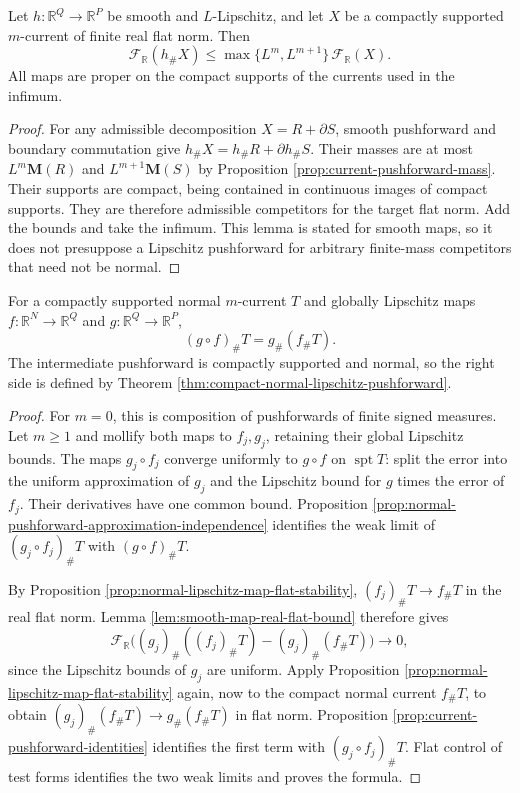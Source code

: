\begin{lemma}\label{lem:smooth-map-real-flat-bound}
Let $h:\mathbb R^Q\to\mathbb R^P$ be smooth and $L$-Lipschitz, and let $X$ be a compactly supported $m$-current of finite real flat norm. Then
\[
 \mathcal F_{\mathbb R}(h_\#X)
 \leq\max\{L^m,L^{m+1}\}\,\mathcal F_{\mathbb R}(X).
\]
All maps are proper on the compact supports of the currents used in the infimum.
\end{lemma}
\begin{proof}
For any admissible decomposition $X=R+\partial S$, smooth pushforward and boundary commutation give $h_\#X=h_\#R+\partial h_\#S$. Their masses are at most $L^m\mathbf M(R)$ and $L^{m+1}\mathbf M(S)$ by Proposition \ref{prop:current-pushforward-mass}. Their supports are compact, being contained in continuous images of compact supports. They are therefore admissible competitors for the target flat norm. Add the bounds and take the infimum. This lemma is stated for smooth maps, so it does not presuppose a Lipschitz pushforward for arbitrary finite-mass competitors that need not be normal.
\end{proof}

\begin{proposition}\label{prop:normal-lipschitz-pushforward-composition}
For a compactly supported normal $m$-current $T$ and globally Lipschitz maps $f:\mathbb R^N\to\mathbb R^Q$ and $g:\mathbb R^Q\to\mathbb R^P$,
\[
 (g\circ f)_\#T=g_\#(f_\#T).
\]
The intermediate pushforward is compactly supported and normal, so the right side is defined by Theorem \ref{thm:compact-normal-lipschitz-pushforward}.
\end{proposition}
\begin{proof}
For $m=0$, this is composition of pushforwards of finite signed measures. Let $m\geq1$ and mollify both maps to $f_j,g_j$, retaining their global Lipschitz bounds. The maps $g_j\circ f_j$ converge uniformly to $g\circ f$ on $\operatorname{spt}T$: split the error into the uniform approximation of $g_j$ and the Lipschitz bound for $g$ times the error of $f_j$. Their derivatives have one common bound. Proposition \ref{prop:normal-pushforward-approximation-independence} identifies the weak limit of $(g_j\circ f_j)_\#T$ with $(g\circ f)_\#T$.

By Proposition \ref{prop:normal-lipschitz-map-flat-stability}, $(f_j)_\#T\to f_\#T$ in the real flat norm. Lemma \ref{lem:smooth-map-real-flat-bound} therefore gives
\[
 \mathcal F_{\mathbb R}\bigl((g_j)_\#((f_j)_\#T)-(g_j)_\#(f_\#T)\bigr)\to0,
\]
since the Lipschitz bounds of $g_j$ are uniform. Apply Proposition \ref{prop:normal-lipschitz-map-flat-stability} again, now to the compact normal current $f_\#T$, to obtain $(g_j)_\#(f_\#T)\to g_\#(f_\#T)$ in flat norm. Proposition \ref{prop:current-pushforward-identities} identifies the first term with $(g_j\circ f_j)_\#T$. Flat control of test forms identifies the two weak limits and proves the formula.
\end{proof}

